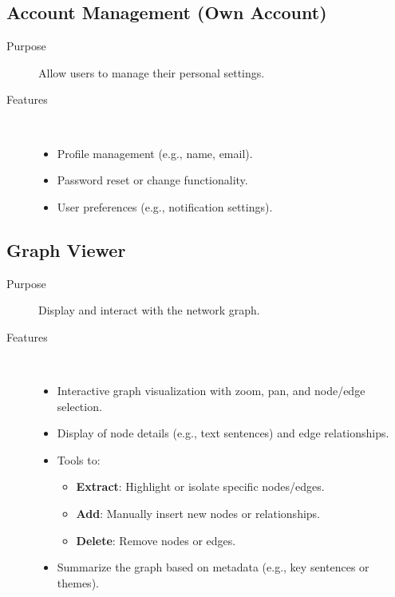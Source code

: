 \documentclass[%
 reprint,
 amsmath,amssymb,
 aps,
]{revtex4-2}
\begin{document}
\subsection{\label{sec:account_management}Account Management (Own Account)}
\begin{description}
\item[Purpose] Allow users to manage their personal settings.
\item[Features] ~
\begin{itemize}
\item Profile management (e.g., name, email).
\item Password reset or change functionality.
\item User preferences (e.g., notification settings).
\end{itemize}
\end{description}

\vspace{1cm}

\subsection{\label{sec:graph_viewer}Graph Viewer}
\begin{description}
\item[Purpose] Display and interact with the network graph.
\item[Features] ~
\begin{itemize}
\item Interactive graph visualization with zoom, pan, and node/edge selection.
\item Display of node details (e.g., text sentences) and edge relationships.
\item Tools to:
\begin{itemize}
\item \textbf{Extract}: Highlight or isolate specific nodes/edges.
\item \textbf{Add}: Manually insert new nodes or relationships.
\item \textbf{Delete}: Remove nodes or edges.
\end{itemize}
\item Summarize the graph based on metadata (e.g., key sentences or themes).
\end{itemize}
\end{description}
\end{document}

